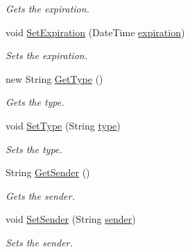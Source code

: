 \begin{DoxyCompactItemize}
\begin{DoxyCompactList}\small\item\em Gets the expiration. \end{DoxyCompactList}\item 
void \hyperlink{classcom_1_1shephertz_1_1app42_1_1paas_1_1sdk_1_1csharp_1_1gift_1_1_gift_1_1_requests_a7d2e95a83b5b5190cf19eb5508ca209a}{Set\+Expiration} (Date\+Time \hyperlink{classcom_1_1shephertz_1_1app42_1_1paas_1_1sdk_1_1csharp_1_1gift_1_1_gift_1_1_requests_afc0258103b38d39c4b5a5f665e658483}{expiration})
\begin{DoxyCompactList}\small\item\em Sets the expiration. \end{DoxyCompactList}\item 
new String \hyperlink{classcom_1_1shephertz_1_1app42_1_1paas_1_1sdk_1_1csharp_1_1gift_1_1_gift_1_1_requests_a3962a0310143ff6bd2dec37bfd2d770e}{Get\+Type} ()
\begin{DoxyCompactList}\small\item\em Gets the type. \end{DoxyCompactList}\item 
void \hyperlink{classcom_1_1shephertz_1_1app42_1_1paas_1_1sdk_1_1csharp_1_1gift_1_1_gift_1_1_requests_a90df85f3f8baaa56a9bbec82c56d89d1}{Set\+Type} (String \hyperlink{classcom_1_1shephertz_1_1app42_1_1paas_1_1sdk_1_1csharp_1_1gift_1_1_gift_1_1_requests_ade1faf3921afa255a58884cd417a87b6}{type})
\begin{DoxyCompactList}\small\item\em Sets the type. \end{DoxyCompactList}\item 
String \hyperlink{classcom_1_1shephertz_1_1app42_1_1paas_1_1sdk_1_1csharp_1_1gift_1_1_gift_1_1_requests_afedc86b4e03350662baa81db965d028f}{Get\+Sender} ()
\begin{DoxyCompactList}\small\item\em Gets the sender. \end{DoxyCompactList}\item 
void \hyperlink{classcom_1_1shephertz_1_1app42_1_1paas_1_1sdk_1_1csharp_1_1gift_1_1_gift_1_1_requests_a7bb912e6d4f3888d8e4425f71d86c71f}{Set\+Sender} (String \hyperlink{classcom_1_1shephertz_1_1app42_1_1paas_1_1sdk_1_1csharp_1_1gift_1_1_gift_1_1_requests_a6e273754237e4faa7637d9de156d1579}{sender})
\begin{DoxyCompactList}\small\item\em Sets the sender. \end{DoxyCompactList}\item 

\end{DoxyCompactItemize}
